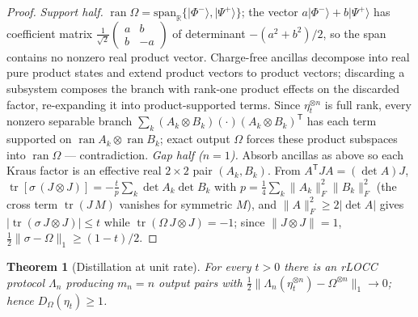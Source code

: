 \documentclass[11pt]{article}
\theoremstyle{plain}
\newtheorem{theorem}{Theorem}[section]
\theoremstyle{definition}
\theoremstyle{remark}
\theoremstyle{plain}
\newcommand{\tr}{\operatorname{tr}}
\newcommand{\R}{\mathbb{R}}
\newcommand{\Om}{\Omega}
\newcommand{\suppop}{\operatorname{ran}}
\begin{document}
\begin{proof}
\emph{Support half.} $\suppop\Om =
\mathrm{span}_\R\{|\Phi^-\rangle,|\Psi^+\rangle\}$; the vector
$a|\Phi^-\rangle + b|\Psi^+\rangle$ has coefficient matrix
$\tfrac1{\sqrt2}\begin{pmatrix}a&b\\b&-a\end{pmatrix}$ of
determinant $-(a^2+b^2)/2$, so the span contains no nonzero real
product vector. Charge-free ancillas decompose into real pure
product states and extend product vectors to product vectors;
discarding a subsystem composes the branch with rank-one
product effects on the discarded factor, re-expanding it into
product-supported terms. Since $\eta_t^{\otimes n}$ is full rank,
every nonzero separable branch $\sum_k(A_k\otimes B_k)(\cdot)
(A_k\otimes B_k)^{\mathsf T}$ has each term supported on
$\operatorname{ran}A_k\otimes\operatorname{ran}B_k$; exact output
$\Om$ forces these product subspaces into $\suppop\Om$ ---
contradiction.
\emph{Gap half ($n = 1$).} Absorb ancillas as above so each Kraus
factor is an effective real $2\times2$ pair $(A_k,B_k)$. From
$A^{\mathsf T}JA = (\det A)J$,
$\tr[\sigma\,(J\otimes J)] = -\tfrac{t}{p}\sum_k\det A_k\det B_k$
with $p = \tfrac14\sum_k\|A_k\|_F^2\|B_k\|_F^2$ (the cross term
$\tr(J\,M)$ vanishes for symmetric $M$), and
$\|A\|_F^2\ge2|\det A|$ gives $|\tr(\sigma\,J\otimes J)|\le t$
while $\tr(\Om\,J\otimes J) = -1$; since $\|J\otimes J\| = 1$,
$\tfrac12\|\sigma-\Om\|_1\ge(1-t)/2$.
\end{proof}

\begin{theorem}[Distillation at unit rate]\label{thm:distill}
For every $t>0$ there is an rLOCC protocol $\Lambda_n$ producing
$m_n = n$ output pairs with
$\tfrac12\|\Lambda_n(\eta_t^{\otimes n}) - \Om^{\otimes n}\|_1
\to 0$; hence $D_\Om(\eta_t)\ge1$.
\end{theorem}
\end{document}
